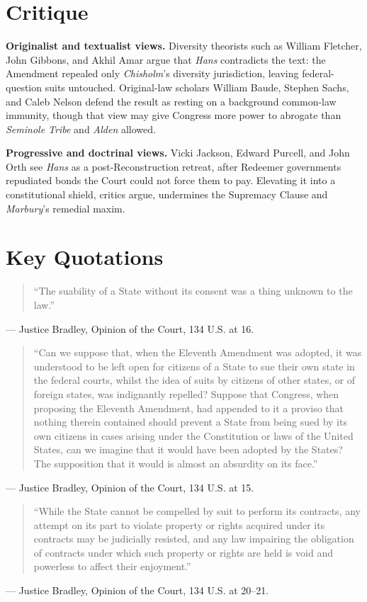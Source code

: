 \documentclass[12pt]{article}
\begin{document}
\section{Critique}

\textbf{Originalist and textualist views.} Diversity theorists such as William Fletcher, John Gibbons, and Akhil Amar argue that \textit{Hans} contradicts the text: the Amendment repealed only \textit{Chisholm}'s diversity jurisdiction, leaving federal-question suits untouched. Original-law scholars William Baude, Stephen Sachs, and Caleb Nelson defend the result as resting on a background common-law immunity, though that view may give Congress more power to abrogate than \textit{Seminole Tribe} and \textit{Alden} allowed.

\textbf{Progressive and doctrinal views.} Vicki Jackson, Edward Purcell, and John Orth see \textit{Hans} as a post-Reconstruction retreat, after Redeemer governments repudiated bonds the Court could not force them to pay. Elevating it into a constitutional shield, critics argue, undermines the Supremacy Clause and \textit{Marbury}'s remedial maxim.

\section{Key Quotations}

\begin{quote}
``The suability of a State without its consent was a thing unknown to the law.''
\end{quote}
\noindent --- Justice Bradley, Opinion of the Court, 134 U.S. at 16.

\begin{quote}
``Can we suppose that, when the Eleventh Amendment was adopted, it was understood to be left open for citizens of a State to sue their own state in the federal courts, whilst the idea of suits by citizens of other states, or of foreign states, was indignantly repelled? Suppose that Congress, when proposing the Eleventh Amendment, had appended to it a proviso that nothing therein contained should prevent a State from being sued by its own citizens in cases arising under the Constitution or laws of the United States, can we imagine that it would have been adopted by the States? The supposition that it would is almost an absurdity on its face.''
\end{quote}
\noindent --- Justice Bradley, Opinion of the Court, 134 U.S. at 15.

\begin{quote}
``While the State cannot be compelled by suit to perform its contracts, any attempt on its part to violate property or rights acquired under its contracts may be judicially resisted, and any law impairing the obligation of contracts under which such property or rights are held is void and powerless to affect their enjoyment.''
\end{quote}
\noindent --- Justice Bradley, Opinion of the Court, 134 U.S. at 20--21.
\end{document}
